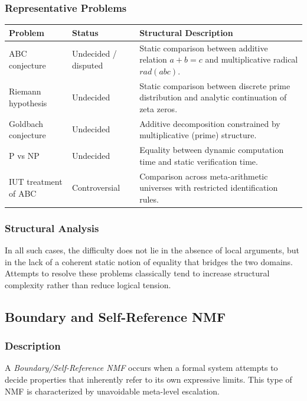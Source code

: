 \documentclass[11pt]{article}
\begin{document}
\subsubsection{Representative Problems}

\begin{center}
\begin{tabular}{|l|l|p{7cm}|}
\hline
Problem & Status & Structural Description \\
\hline
ABC conjecture & Undecided / disputed &
Static comparison between additive relation $a+b=c$
and multiplicative radical $rad(abc)$. \\
\hline
Riemann hypothesis & Undecided &
Static comparison between discrete prime distribution
and analytic continuation of zeta zeros. \\
\hline
Goldbach conjecture & Undecided &
Additive decomposition constrained by multiplicative
(prime) structure. \\
\hline
P vs NP & Undecided &
Equality between dynamic computation time
and static verification time. \\
\hline
IUT treatment of ABC & Controversial &
Comparison across meta-arithmetic universes with
restricted identification rules. \\
\hline
\end{tabular}
\end{center}

\subsubsection{Structural Analysis}

In all such cases, the difficulty does not lie in the absence of local
arguments, but in the lack of a coherent static notion of equality
that bridges the two domains.
Attempts to resolve these problems classically tend to increase
structural complexity rather than reduce logical tension.

\subsection{Boundary and Self-Reference NMF}

\subsubsection{Description}

A \emph{Boundary/Self-Reference NMF} occurs when a formal system attempts
to decide properties that inherently refer to its own expressive limits.
This type of NMF is characterized by unavoidable meta-level escalation.
\end{document}
